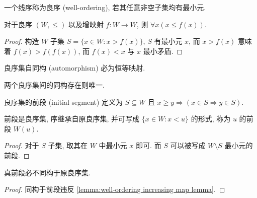 \begin{definition}
    一个线序称为良序 (well-ordering), 若其任意非空子集均有最小元.
\end{definition}

\begin{lemma}
    \label{lemma:well-ordering increasing map lemma}
    对于良序 \((W, \le)\) 以及增映射 \(f : W \to W\), 则 \(\forall x (x \le f(x))\).

    \begin{proof}
        构造 \(W\) 子集 \(S = \{x \in W : x > f(x)\}\), \(S\) 有最小元 \(x\),
        而 \(x > f(x)\) 意味着 \(f(x) > f(f(x))\), 而 \(f(x) < x\) 与 \(x\) 最小矛盾.
    \end{proof}
\end{lemma}

\begin{corollary}
    良序集自同构 (automorphism) 必为恒等映射.
\end{corollary}

\begin{corollary}
    两个良序集间的同构存在则唯一.
\end{corollary}

\begin{definition}
    良序集的前段 (initial segment) 定义为 \(S \subseteq W\) 且 \(x \ge y \Rightarrow (x \in S \Rightarrow y \in S)\).
\end{definition}

\begin{lemma}
    \label{lemma:well-ordering segment is well-ordering lemma}
    前段是良序集, 序继承自原良序集, 并可写成 \(\{x \in W : x < u\}\) 的形式, 称为 \(u\) 的前段 \(W(u)\).

    \begin{proof}
        对于 \(S\) 子集, 取其在 \(W\) 中最小元 \(x\) 即可. 而 \(S\) 可以被写成 \(W \setminus S\) 最小元的前段.
    \end{proof}
\end{lemma}

\begin{lemma}
    \label{lemma:well-ordering segment unequal lemma}
    真前段必不同构于原良序集.

    \begin{proof}
        同构于前段违反 \ref{lemma:well-ordering increasing map lemma}.
    \end{proof}
\end{lemma}

